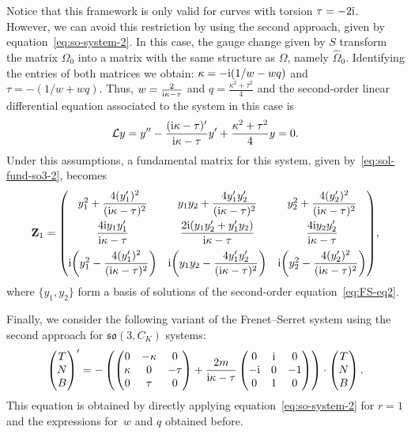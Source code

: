 \documentclass[pdftex]{sigma}%
\numberwithin{equation}{section}
\begin{document}
Notice that this framework is only valid for curves with torsion $\tau=-2{\rm i}$. However, we can avoid this restriction by using the second approach, given by equation~\eqref{eq:so-system-2}. In this case, the gauge change given by $S$ transform the matrix $\Omega_0$ into a matrix with the same structure as $\Omega$, namely $\widehat{\Omega}_0$. Identifying the entries of both matrices we obtain: $\kappa = -{\rm i}(1/w -wq)$ and $\tau = -(1/w +wq)$. Thus, $w = \frac{2}{{\rm i}\kappa - \tau}$ and $q = \frac{\kappa^2 + \tau^2}{4}$ and the second-order linear differential equation associated to the system in this case is
\begin{gather}\label{eq:FS-eq2}
 \mathcal{L} y = y'' - \dfrac{({\rm i}\kappa - \tau)'}{{\rm i} \kappa - \tau} y' +\dfrac{\kappa^2 + \tau^2}{4}y =0.
\end{gather}
Under this assumptions, a fundamental matrix for this system, given by~\eqref{eq:sol-fund-so3-2}, becomes{\samepage
\begin{gather*}
\mathbf{Z}_1 = \begin{pmatrix}
y_1^2 + \dfrac{4(y_1')^2}{({\rm i}\kappa - \tau)^2} & y_1 y_2 + \dfrac{4y_1' y_2'}{({\rm i}\kappa - \tau)^2} & y_2^2 + \dfrac{4 (y_2')^2}{({\rm i}\kappa - \tau)^2} \\[9pt]
\dfrac{4{\rm i} y_1 y_1'}{{\rm i}\kappa - \tau} & \dfrac{2{\rm i} (y_1 y_2' + y_1' y_2)}{{\rm i}\kappa - \tau} & \dfrac{4{\rm i} y_2 y_2'}{{\rm i}\kappa - \tau} \\[9pt]
{\rm i} \bigg( y_1^2 - \dfrac{4 (y_1')^2}{({\rm i}\kappa - \tau)^2}\bigg) & {\rm i} \bigg( y_1 y_2 - \dfrac{4 y_1' y_2'}{({\rm i}\kappa - \tau)^2} \bigg) & {\rm i} \bigg( y_2^2 - \dfrac{4 (y_2')^2}{({\rm i}\kappa - \tau)^2} \bigg ) \end{pmatrix}\!,
\end{gather*}
where $\{ y_1, y_2\}$ form a basis of solutions of the second-order equation~\eqref{eq:FS-eq2}.}

Finally, we consider the following
variant of the Frenet--Serret system using the second approach for $\mathfrak{so}(3, C_K)$ systems:
\begin{gather*}
\begin{pmatrix} T \\ N \\ B \end{pmatrix}' = - \left ( \begin{pmatrix}
0 & -\kappa & 0 \\ \kappa & 0 & - \tau \\ 0 & \tau & 0 \end{pmatrix} + \frac{2m}{{\rm i}\kappa - \tau} \begin{pmatrix} 0 & {\rm i} & 0 \\ -{\rm i} & 0 & -1 \\ 0 & 1 & 0 \end{pmatrix} \right ) \cdot \begin{pmatrix} T \\ N \\ B \end{pmatrix} .
\end{gather*}
This equation is obtained by directly applying equation~\eqref{eq:so-system-2}
 for $r=1$ and the expressions for~$w$ and $q$ obtained before.
\end{document}
